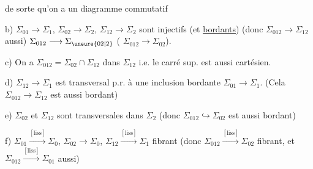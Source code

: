 de sorte qu'on a un diagramme commutatif

b) $\Sigma_{01}\longrightarrow\Sigma_1$, $\Sigma_{02}\longrightarrow\Sigma_2$, $\Sigma_{12}\longrightarrow\Sigma_2$ sont injectifs
(et \uline{bordants}) (donc $\Sigma_{012}\longrightarrow\Sigma_{12}$ aussi)
  $\Sigma_{012}\longrightarrow\Sigma_{\unsure{02|2}}$
  (\deleted{$\unsure{\Longleftrightarrow}$} $\Sigma_{012}\longrightarrow\Sigma_{02}$).

c) 
On a $\Sigma_{012}=\Sigma_{02}\cap\Sigma_{12}$ dans $\Sigma_{12}$ i.e.
le carré sup. est aussi cartésien.

d) $\Sigma_{12}\longrightarrow\Sigma_1$ est transversal p.r. à
une inclusion bordante $\Sigma_{01}\longrightarrow\Sigma_1$. (Cela 
$\Sigma_{012}\longrightarrow\Sigma_{12}$ est aussi bordant)

e) $\Sigma_{02}$ et $\Sigma_{12}$ sont  transversales dans $\Sigma_2$
(donc $\Sigma_{012}\hookrightarrow\Sigma_{02}$ est aussi bordant)

f) $\Sigma_{01}\xrightarrow{[\mathrm{liss}]}\Sigma_0$, $\Sigma_{02}\longrightarrow\Sigma_0$, $\Sigma_{12}\xrightarrow{[\mathrm{liss}]}\Sigma_1$ fibrant
(donc $\Sigma_{012}\xrightarrow{[\mathrm{liss}]}\Sigma_{02}$ fibrant,  et $\Sigma_{012}\xrightarrow{[\mathrm{liss}]}\Sigma_{01}$ aussi)


